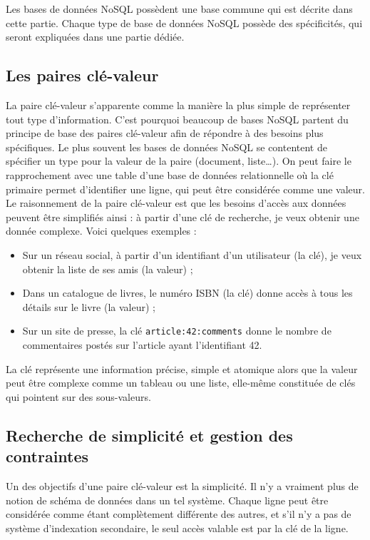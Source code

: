 Les bases de données NoSQL possèdent une base commune qui est décrite dans cette partie. Chaque type de base de données NoSQL possède des spécificités, qui seront expliquées dans une partie dédiée.

\subsection{Les paires clé-valeur}
	La paire clé-valeur s'apparente comme la manière la plus simple de représenter tout type d'information. C'est pourquoi beaucoup de bases NoSQL partent du principe de base des paires clé-valeur afin de répondre à des besoins plus spécifiques. Le plus souvent  les bases de données NoSQL se contentent de spécifier un type pour la valeur de la paire (document, liste\dots). On peut faire le rapprochement avec une table d'une base de données relationnelle où la clé primaire permet d'identifier une ligne, qui peut être considérée comme une valeur.\\

	Le raisonnement de la paire clé-valeur est que les besoins d'accès aux données peuvent être simplifiés ainsi : à partir d'une clé de recherche, je veux obtenir une donnée complexe. Voici quelques exemples :
	\begin{itemize}
		\item Sur un réseau social, à partir d'un identifiant d'un utilisateur (la clé), je veux obtenir la liste de ses amis (la valeur) ;
		\item Dans un catalogue de livres, le numéro ISBN (la clé) donne accès à tous les détails sur le livre (la valeur) ;
		\item Sur un site de presse, la clé \texttt{article:42:comments} donne le nombre de commentaires postés sur l'article ayant l'identifiant 42.
	\end{itemize}
	\vspace{20px}

	La clé représente une information précise, simple et atomique alors que la valeur peut être complexe comme un tableau ou une liste, elle-même constituée de clés qui pointent sur des sous-valeurs.

\subsection{Recherche de simplicité et gestion des contraintes}
	Un des objectifs d'une paire clé-valeur est la simplicité. Il n'y a vraiment plus de notion de schéma de données dans un tel système. Chaque ligne peut être considérée comme étant complètement différente des autres, et s'il n'y a pas de système d'indexation secondaire, le seul accès valable est par la clé de la ligne.\\


